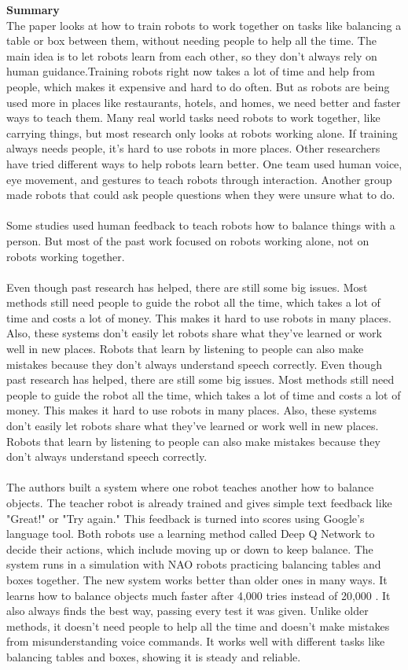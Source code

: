 \documentclass[report.tex]{subfiles}
\begin{document}
\noindent\textbf{Summary} \\
The paper looks at how to train robots to work together on tasks like balancing a table or box between them, without needing people to help all the time. The main idea is to let robots learn from each other, so they don’t always rely on human guidance.Training robots right now takes a lot of time and help from people, which makes it expensive and hard to do often. But as robots are being used more in places like restaurants, hotels, and homes, we need better and faster ways to teach them. Many real world tasks need robots to work together, like carrying things, but most research only looks at robots working alone. If training always needs people, it’s hard to use robots in more places. Other researchers have tried different ways to help robots learn better. One team used human voice, eye movement, and gestures to teach robots through interaction. Another group made robots that could ask people questions when they were unsure what to do.\\\\ Some studies used human feedback to teach robots how to balance things with a person. But most of the past work focused on robots working alone, not on robots working together.\\\\
\noindent\textbf{}Even though past research has helped, there are still some big issues. Most methods still need people to guide the robot all the time, which takes a lot of time and costs a lot of money. This makes it hard to use robots in many places. Also, these systems don’t easily let robots share what they’ve learned or work well in new places. Robots that learn by listening to people can also make mistakes because they don’t always understand speech correctly. Even though past research has helped, there are still some big issues. Most methods still need people to guide the robot all the time, which takes a lot of time and costs a lot of money. This makes it hard to use robots in many places. Also, these systems don’t easily let robots share what they’ve learned or work well in new places. Robots that learn by listening to people can also make mistakes because they don’t always understand speech correctly.\\\\
\noindent\textbf{} The authors built a system where one robot teaches another how to balance objects. The teacher robot is already trained and gives simple text feedback like "Great!" or "Try again." This feedback is turned into scores using Google’s language tool. Both robots use a learning method called Deep Q Network to decide their actions, which include moving up or down to keep balance. The system runs in a simulation with NAO robots practicing balancing tables and boxes together.
The new system works better than older ones in many ways. It learns how to balance objects much faster after 4,000 tries instead of 20,000 . It also always finds the best way, passing every test it was given. Unlike older methods, it doesn’t need people to help all the time and doesn’t make mistakes from misunderstanding voice commands. It works well with different tasks like balancing tables and boxes, showing it is steady and reliable. 
\end{document}
